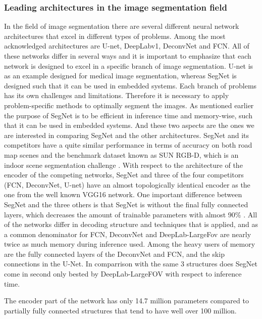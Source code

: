\documentclass{article}
\begin{document}
\subsubsection{Leading architectures in the image segmentation field}
In the field of image segmentation there are several different neural network architectures that excel in different types of problems. Among the most acknowledged architectures are U-net, DeepLabv1, DeconvNet and FCN. 
All of these networks differ in several ways and it is important to emphasize that each network is designed to excel in a specific branch of image segmentation. U-net is as an example designed for medical image segmentation, whereas SegNet is designed such that it can be used in embedded systems. Each branch of problems has its own challenges and limitations. Therefore it is necessary to apply problem-specific methods to optimally segment the images. 
As mentioned earlier the purpose of SegNet is to be efficient in inference time and memory-wise, such that it can be used in embedded systems. And these two aspects are the ones we are interested in comparing SegNet and the other architectures. 
SegNet and its competitors have a quite similar performance in terms of accuracy on both road map scenes and the benchmark dataset known as SUN RGB-D, which is an indoor scene segmentation challenge \cite{seg}. 
With respect to the architecture of the encoder of the competing networks, SegNet and three of the four competitors (FCN, DeconvNet, U-net) have an almost topologically identical encoder as the one from the well known VGG16 network. One important difference between SegNet and the three others is that SegNet is without the final fully connected layers, which decreases the amount of trainable parameters with almost 90\% \cite{seg}. 
All of the networks differ in decoding structure and techniques that is applied, and as a common denominator for FCN, DeconvNet and DeepLab-LargeFov are nearly twice as much memory during inference used. Among the heavy users of memory are the fully connected layers of the DeconvNet and FCN, and the skip connections in the U-Net. In comparrison with the same 3 structures does SegNet come in second only bested by DeepLab-LargeFOV with respect to inference time.


The encoder part of the network has only 14.7 million parameters compared to partially fully connected structures that tend to have well over 100 million. \cite{seg}
\end{document}
